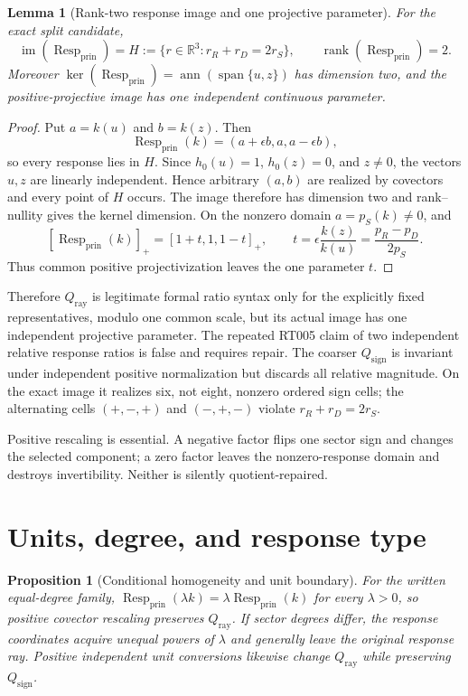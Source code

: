 \documentclass[11pt]{article}
\newtheorem{lemma}{Lemma}
\newtheorem{proposition}{Proposition}
\newcommand{\RR}{\mathbb R}
\newcommand{\Resp}{\operatorname{Resp}_{\mathrm{prin}}}
\newcommand{\Qray}{Q_{\mathrm{ray}}}
\newcommand{\Qsign}{Q_{\mathrm{sign}}}
\begin{document}
\begin{lemma}[Rank-two response image and one projective parameter]
For the exact split candidate,
\[
 \operatorname{im}(\Resp)=
 H:=\{r\in\RR^3:r_R+r_D=2r_S\},
 \qquad \operatorname{rank}(\Resp)=2.
\]
Moreover $\ker(\Resp)=\operatorname{ann}(\operatorname{span}\{u,z\})$
has dimension two, and the positive-projective image has one independent
continuous parameter.
\end{lemma}

\begin{proof}
Put $a=k(u)$ and $b=k(z)$.  Then
\[
 \Resp(k)=(a+\epsilon b,a,a-\epsilon b),
\]
so every response lies in $H$.  Since $h_0(u)=1$, $h_0(z)=0$, and $z\ne0$,
the vectors $u,z$ are linearly independent.  Hence arbitrary $(a,b)$ are
realized by covectors and every point of $H$ occurs.  The image therefore has
dimension two and rank--nullity gives the kernel dimension.  On the nonzero
domain $a=p_S(k)\ne0$, and
\[
 [\Resp(k)]_+=[1+t,1,1-t]_+,
 \qquad t=\epsilon\frac{k(z)}{k(u)}
       =\frac{p_R-p_D}{2p_S}.
\]
Thus common positive projectivization leaves the one parameter $t$.
\end{proof}

Therefore $\Qray$ is legitimate formal ratio syntax only for the explicitly
fixed representatives, modulo one common scale, but its actual image has one
independent projective parameter.  The repeated RT005 claim of two independent
relative response ratios is false and requires repair.  The coarser $\Qsign$
is invariant under independent positive normalization but discards all
relative magnitude.  On the exact image it realizes six, not eight, nonzero
ordered sign cells; the alternating cells $(+,-,+)$ and $(-,+,-)$ violate
$r_R+r_D=2r_S$.

Positive rescaling is essential.  A negative factor flips one sector sign and
changes the selected component; a zero factor leaves the nonzero-response
domain and destroys invertibility.  Neither is silently quotient-repaired.

\section{Units, degree, and response type}

\begin{proposition}[Conditional homogeneity and unit boundary]
For the written equal-degree family,
$\Resp(\lambda k)=\lambda\Resp(k)$ for every $\lambda>0$, so positive
covector rescaling preserves $\Qray$.  If sector degrees differ, the response
coordinates acquire unequal powers of $\lambda$ and generally leave the
original response ray.  Positive independent unit conversions likewise change
$\Qray$ while preserving $\Qsign$.
\end{proposition}
\end{document}
